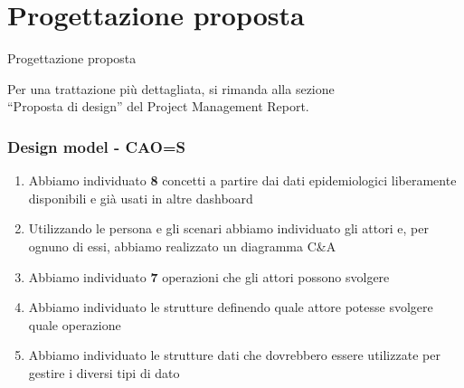\documentclass[handout]{beamer}
\begin{document}
	\section{Progettazione proposta}
		\begin{frame}
			\centering
			\begin{Huge}
				Progettazione proposta
			\end{Huge}
			\mbox{}
			\vfill
			\vspace*{100px}
			\begin{scriptsize}
				Per una trattazione più dettagliata, si rimanda alla sezione\\``Proposta di design'' del Project Management Report.
			\end{scriptsize}
		\end{frame}
		\begin{frame}
			\frametitle{Design model - CAO=S}
			\begin{enumerate}[<+->]
				\item Abbiamo individuato \textbf{8} concetti a partire dai dati epidemiologici liberamente disponibili e già usati in altre dashboard\\
				\item Utilizzando le persona e gli scenari abbiamo individuato gli attori e, per ognuno di essi, abbiamo realizzato un diagramma C\&A\\
				\item Abbiamo individuato \textbf{7} operazioni che gli attori possono svolgere\\
				\item Abbiamo individuato le strutture definendo quale attore potesse svolgere quale operazione\\
				\item Abbiamo individuato le strutture dati che dovrebbero essere utilizzate per gestire i diversi tipi di dato\\
			\end{enumerate}
		\end{frame}
\end{document}
